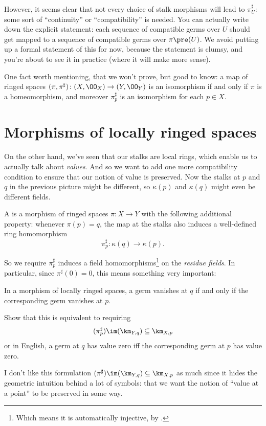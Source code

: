 However, it seems clear that not every choice of
stalk morphisms will lead to $\pi^\sharp_U$:
some sort of ``continuity'' or ``compatibility'' is needed.
You can actually write down the explicit statement:
each sequence of compatible germs over $U$
should get mapped to a sequence of compatible germs over $\pi\pre(U)$.
We avoid putting up a formal statement of this for now,
because the statement is clumsy,
and you're about to see it in practice (where it will make more sense).

\begin{remark}
	One fact worth mentioning, that we won't prove, but good to know:
	a map of ringed spaces
	$(\pi, \pi^\sharp) \colon (X, \OO_X) \to (Y, \OO_Y)$
	is an isomorphism if and only if $\pi$ is a homeomorphism,
	and moreover $\pi^\sharp_p$ is an isomorphism for each $p \in X$.
\end{remark}

\section{Morphisms of locally ringed spaces}
On the other hand, we've seen that our stalks are local rings,
which enable us to actually talk about \emph{values}.
And so we want to add one more compatibility condition
to ensure that our notion of value is preserved.
Now the stalks at $p$ and $q$ in the previous picture might be different,
so $\kappa(p)$ and $\kappa(q)$ might even be different fields.
\begin{definition}
	A 
	is a morphism of ringed spaces $\pi \colon X \to Y$
	with the following additional property:
	whenever $\pi(p) = q$,
	the map at the stalks also induces a well-defined ring homomorphism
	\[ \pi^\sharp_p \colon \kappa(q) \to \kappa(p). \]
\end{definition}
So we require $\pi^\sharp_p$ induces a field homomorphisms\footnote{Which
means it is automatically injective, by .}
on the \emph{residue fields}.
In particular, since $\pi^\sharp(0) = 0$,
this means something very important:
\begin{moral}
	In a morphism of locally ringed spaces,
	a germ vanishes at $q$ if and only if
	the corresponding germ vanishes at $p$.
\end{moral}
\begin{exercise}
	Show that this is equivalent to requiring
	\[ (\pi^\sharp_p)\im(\km_{Y,q}) \subseteq \km_{X,p} \]
	or in English, a germ at $q$ has value zero
	iff the corresponding germ at $p$ has value zero.
\end{exercise}
I don't like this formulation
$(\pi^\sharp)\im(\km_{Y,q}) \subseteq \km_{X,p}$
as much since it hides the geometric intuition behind a lot of symbols:
that we want the notion of ``value at a point''
to be preserved in some way.


